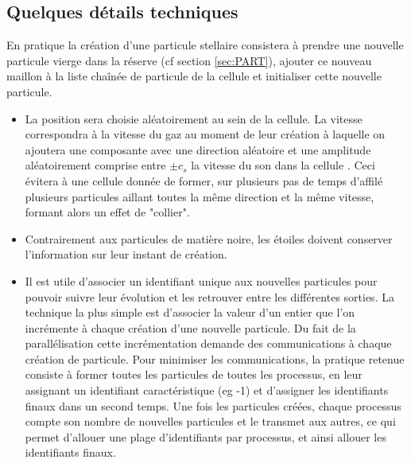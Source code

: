 
\subsection{Quelques détails techniques}
En pratique la création d'une particule stellaire consistera à prendre une nouvelle particule vierge dans la réserve (cf section \ref{sec:PART}), ajouter ce nouveau maillon à la liste chaînée de particule de la cellule et initialiser cette nouvelle particule.

\begin{itemize}

\item La position sera choisie aléatoirement au sein de la cellule.
La vitesse correspondra à la vitesse du gaz au moment de leur création à laquelle on ajoutera une composante avec une direction aléatoire et une amplitude aléatoirement comprise entre $\pm c_s$ la vitesse du son dans la cellule \citep{rasera_history_2006}.
Ceci évitera à une cellule donnée de former, sur plusieurs pas de temps d'affilé plusieurs particules aillant toutes la même direction et la même vitesse, formant alors un effet de "collier".

\item Contrairement aux particules de matière noire, les étoiles doivent conserver l'information sur leur instant de création.


\item Il est utile d'associer un identifiant unique aux nouvelles particules pour pouvoir suivre leur évolution et les retrouver entre les différentes sorties.
La technique la plus simple est d'associer la valeur d'un entier que l'on incrémente à chaque création d'une nouvelle particule.
Du fait de la parallélisation cette incrémentation demande des communications à chaque création de particule.
Pour minimiser les communications, la pratique retenue consiste à former toutes les particules de toutes les processus, en leur assignant un identifiant caractéristique (eg -1) et d'assigner les identifiants finaux dans un second temps.
Une fois les particules créées, chaque processus compte son nombre de nouvelles particules et le transmet aux autres, ce qui permet d'allouer une plage d'identifiants par processus, et ainsi allouer les identifiants finaux.
\end{itemize}


